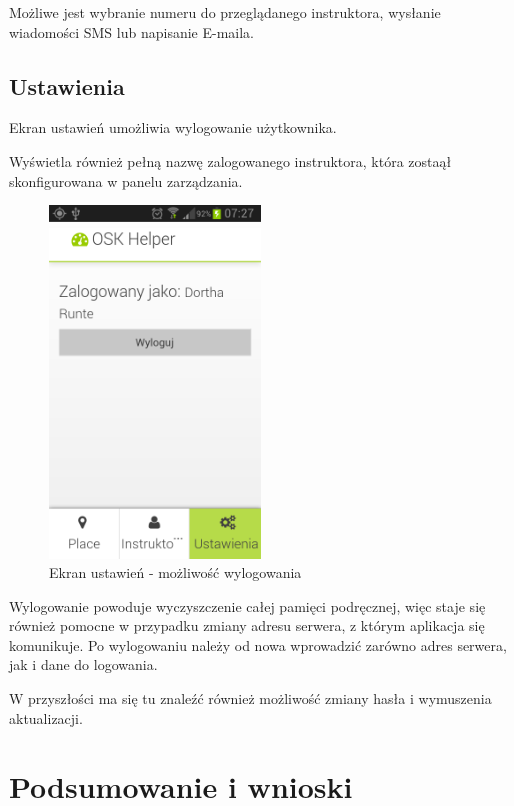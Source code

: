 \documentclass[twoside,a4paper,openright,12pt]{book}
\begin{document}
Możliwe jest wybranie numeru do przeglądanego instruktora, wysłanie wiadomości SMS lub napisanie E-maila.

\newpage
\section{Ustawienia}

Ekran ustawień umożliwia wylogowanie użytkownika.

Wyświetla również pełną nazwę zalogowanego instruktora, która zostaął skonfigurowana w panelu zarządzania.

\begin{figure}[H]
\centering
\includegraphics[width=0.5\textwidth]{screenshots/android/ustawienia.png}
\caption{Ekran ustawień - możliwość wylogowania}
\label{fig:Ustawienia_mobile}
\end{figure}

Wylogowanie powoduje wyczyszczenie całej pamięci podręcznej, więc staje się również pomocne w przypadku zmiany adresu serwera, z którym aplikacja się komunikuje. Po wylogowaniu należy od nowa wprowadzić zarówno adres serwera, jak i dane do logowania.

W przyszłości ma się tu znaleźć również możliwość zmiany hasła i wymuszenia aktualizacji.


\chapter{Podsumowanie i wnioski}
\end{document}
